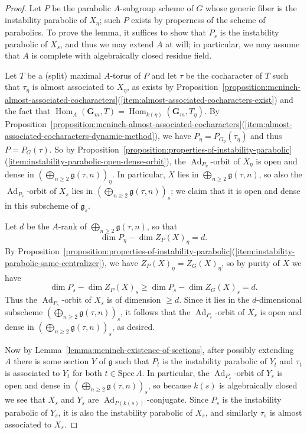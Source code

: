 \documentclass[11pt,reqno]{amsart}
\theoremstyle{definition}
\newcommand{\Spec}{\mathrm{Spec} \,}
\newcommand{\bG}{{\mathbf G}}
\newcommand{\fg}{\mathfrak{g}}
\DeclareMathOperator{\Ad}{Ad}
\DeclareMathOperator{\Hom}{Hom}
\begin{document}
\begin{proof}
Let $P$ be the parabolic $A$-subgroup scheme of $G$ whose generic fiber is the instability parabolic of $X_\eta$; such $P$ exists by properness of the scheme of parabolics. To prove the lemma, it suffices to show that $P_s$ is the instability parabolic of $X_s$, and thus we may extend $A$ at will; in particular, we may assume that $A$ is complete with algebraically closed residue field.\smallskip

Let $T$ be a (split) maximal $A$-torus of $P$ and let $\tau$ be the cocharacter of $T$ such that $\tau_{\eta}$ is almost associated to $X_\eta$, as exists by Proposition~\ref{proposition:mcninch-almost-associated-cocharacters}(\ref{item:almost-associated-cocharacters-exist}) and the fact that $\Hom_A(\bG_m, T) = \Hom_{k(\eta)}(\bG_m, T_\eta)$. By Proposition~\ref{proposition:mcninch-almost-associated-cocharacters}(\ref{item:almost-associated-cocharacters-dynamic-method}), we have $P_\eta = P_{G_\eta}(\tau_{\eta})$ and thus $P = P_G(\tau)$. So by Proposition~\ref{proposition:properties-of-instability-parabolic}(\ref{item:instability-parabolic-open-dense-orbit}), the $\Ad_{P_\eta}$-orbit of $X_\eta$ is open and dense in $(\bigoplus_{n \geq 2} \fg(\tau, n))_\eta$. In particular, $X$ lies in $\bigoplus_{n \geq 2} \fg(\tau, n)$, so also the $\Ad_{P_s}$-orbit of $X_s$ lies in $(\bigoplus_{n \geq 2} \fg(\tau, n))_s$; we claim that it is open and dense in this subscheme of $\fg_s$. \smallskip

Let $d$ be the $A$-rank of $\bigoplus_{n \geq 2} \fg(\tau, n)$, so that
\[
\dim P_\eta - \dim Z_P(X)_\eta = d.
\]
By Proposition~\ref{proposition:properties-of-instability-parabolic}(\ref{item:instability-parabolic-same-centralizer}), we have $Z_P(X)_\eta = Z_G(X)_\eta$, so by purity of $X$ we have
\[
\dim P_s - \dim Z_P(X)_s \geq \dim P_s - \dim Z_G(X)_s = d.
\]
Thus the $\Ad_{P_s}$-orbit of $X_s$ is of dimension $\geq d$. Since it lies in the $d$-dimensional subscheme $(\bigoplus_{n \geq 2} \fg(\tau, n))_s$, it follows that the $\Ad_{P_s}$-orbit of $X_s$ is open and dense in $(\bigoplus_{n \geq 2} \fg(\tau, n))_s$, as desired. \smallskip

Now by Lemma~\ref{lemma:mcninch-existence-of-sections}, after possibly extending $A$ there is some section $Y$ of $\fg$ such that $P_t$ is the instability parabolic of $Y_t$ and $\tau_t$ is associated to $Y_t$ for both $t \in \Spec A$. In particular, the $\Ad_{P_s}$-orbit of $Y_s$ is open and dense in $(\bigoplus_{n \geq 2} \fg(\tau, n))_s$, so because $k(s)$ is algebraically closed we see that $X_s$ and $Y_s$ are $\Ad_{P(k(s))}$-conjugate. Since $P_s$ is the instability parabolic of $Y_s$, it is also the instability parabolic of $X_s$, and similarly $\tau_s$ is almost associated to $X_s$.
\end{proof}
\end{document}
